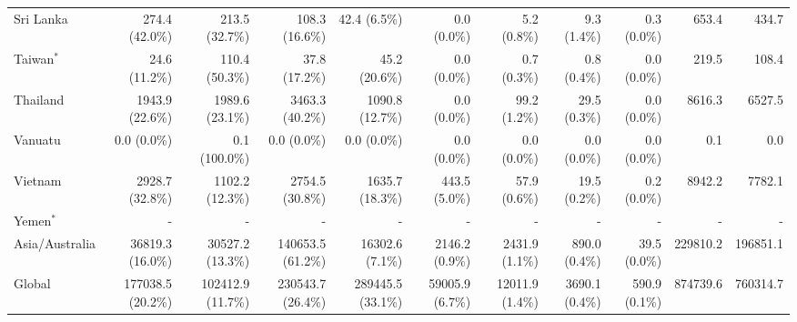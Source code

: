 \begin{scriptsize}
\begin{landscape}
\begin{center}
\begin{longtable}[ht]{lrrrrrrrrrr}
			Sri Lanka&274.4 (42.0\%)&213.5 (32.7\%)&108.3 (16.6\%)&42.4 (6.5\%)&0.0 (0.0\%)&5.2 (0.8\%)&9.3 (1.4\%)&0.3 (0.0\%)&653.4&434.7\\
			Taiwan$^*$&24.6 (11.2\%)&110.4 (50.3\%)&37.8 (17.2\%)&45.2 (20.6\%)&0.0 (0.0\%)&0.7 (0.3\%)&0.8 (0.4\%)&0.0 (0.0\%)&219.5&108.4\\
			Thailand&1943.9 (22.6\%)&1989.6 (23.1\%)&3463.3 (40.2\%)&1090.8 (12.7\%)&0.0 (0.0\%)&99.2 (1.2\%)&29.5 (0.3\%)&0.0 (0.0\%)&8616.3&6527.5\\
			Vanuatu&0.0 (0.0\%)&0.1 (100.0\%)&0.0 (0.0\%)&0.0 (0.0\%)&0.0 (0.0\%)&0.0 (0.0\%)&0.0 (0.0\%)&0.0 (0.0\%)&0.1&0.0\\
			Vietnam&2928.7 (32.8\%)&1102.2 (12.3\%)&2754.5 (30.8\%)&1635.7 (18.3\%)&443.5 (5.0\%)&57.9 (0.6\%)&19.5 (0.2\%)&0.2 (0.0\%)&8942.2&7782.1\\
			Yemen$^*$&-&-&-&-&-&-&-&-&-&-\\\hline
			Asia/Australia&36819.3 (16.0\%)&30527.2 (13.3\%)&140653.5 (61.2\%)&16302.6 (7.1\%)&2146.2 (0.9\%)&2431.9 (1.1\%)&890.0 (0.4\%)&39.5 (0.0\%)&229810.2&196851.1\\\hline

			Global&177038.5 (20.2\%)&102412.9 (11.7\%)&230543.7 (26.4\%)&289445.5 (33.1\%)&59005.9 (6.7\%)&12011.9 (1.4\%)&3690.1 (0.4\%)&590.9 (0.1\%)&874739.6&760314.7\\
			\end{longtable}
		\end{center}
	\end{landscape}
\end{scriptsize}